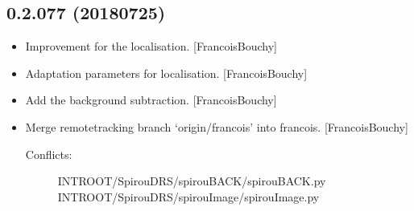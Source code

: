 \documentclass[a4paper,10pt,english]{report}
\begin{document}
\subsection{0.2.077 (2018\sphinxhyphen{}07\sphinxhyphen{}25)}
\label{\detokenize{misc/changelog:id404}}\begin{itemize}
\item {} 
Improvement for the localisation. {[}FrancoisBouchy{]}

\item {} 
Adaptation parameters for localisation. {[}FrancoisBouchy{]}

\item {} 
Add the background subtraction. {[}FrancoisBouchy{]}

\item {} 
Merge remote\sphinxhyphen{}tracking branch ‘origin/francois’ into francois.
{[}FrancoisBouchy{]}
\begin{description}
\item[{Conflicts:}] \leavevmode
{}
INTROOT/SpirouDRS/spirouBACK/spirouBACK.py
INTROOT/SpirouDRS/spirouImage/spirouImage.py

\end{description}

\end{itemize}
\end{document}
